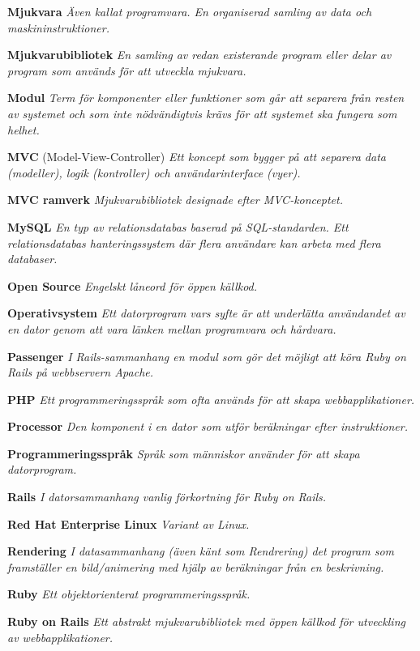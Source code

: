 \documentclass[a4paper, twoside, 11pt, titlepage]{article}
\begin{document}
	\textbf{Mjukvara} \emph{Även kallat programvara. En organiserad samling av data och maskininstruktioner.}

	\textbf{Mjukvarubibliotek} \emph{En samling av redan existerande program eller delar av program som används för att utveckla mjukvara.}

	\textbf{Modul} \emph{Term för komponenter eller funktioner som går att separera från resten av systemet och som inte nödvändigtvis krävs för att systemet ska fungera som helhet.}

	\textbf{MVC} (Model-View-Controller) \emph{Ett koncept som bygger på att separera data (modeller), logik (kontroller) och användarinterface (vyer).}

	\textbf{MVC ramverk} \emph{Mjukvarubibliotek designade efter MVC-konceptet.}

	\textbf{MySQL} \emph{En typ av relationsdatabas baserad på SQL-standarden. Ett relationsdatabas hanteringssystem där flera användare kan arbeta med flera databaser.}

	\textbf{Open Source} \emph{Engelskt låneord för öppen källkod.}

	\textbf{Operativsystem} \emph{Ett datorprogram vars syfte är att underlätta användandet av en dator genom att vara länken mellan programvara och hårdvara.}

	\textbf{Passenger} \emph{I Rails-sammanhang en modul som gör det möjligt att köra Ruby on Rails på webbservern Apache.}

	\textbf{PHP} \emph{Ett programmeringsspråk som ofta används för att skapa webbapplikationer.}

	\textbf{Processor} \emph{Den komponent i en dator som utför beräkningar efter instruktioner.}

	\textbf{Programmeringsspråk} \emph{Språk som människor använder för att skapa datorprogram.}

	\textbf{Rails} \emph{I datorsammanhang vanlig förkortning för Ruby on Rails.}

	\textbf{Red Hat Enterprise Linux} \emph{Variant av Linux.}

	\textbf{Rendering} \emph{I datasammanhang (även känt som Rendrering) det program som framställer en bild/animering med hjälp av beräkningar från en beskrivning.}

	\textbf{Ruby} \emph{Ett objektorienterat programmeringsspråk.}

	\textbf{Ruby on Rails} \emph{Ett abstrakt mjukvarubibliotek med öppen källkod för utveckling av webbapplikationer.}
\end{document}
